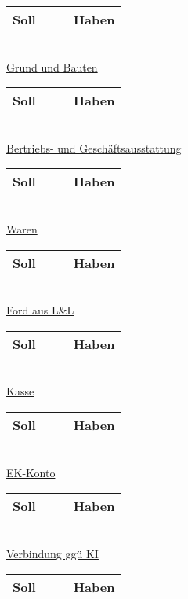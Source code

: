 \documentclass[paper=a4, fontsize=11pt]{scrartcl}
\numberwithin{equation}{section}
\numberwithin{figure}{section}
\numberwithin{table}{section}
\begin{document}
\begin{tabular}{cc|cc}
\hline
Soll & & & Haben \\
\hline
 
\end{tabular}
\\

\underline{Grund und Bauten}

\begin{tabular}{cc|cc}
\hline
Soll & & & Haben \\
\hline
\end{tabular}
\\

\underline{Bertriebs- und Geschäftsausstattung}

\begin{tabular}{cc|cc}
\hline
Soll & & & Haben \\
\hline
\end{tabular}
\\

\underline{Waren}

\begin{tabular}{cc|cc}
\hline
Soll & & & Haben \\
\hline
\end{tabular}
\\

\underline{Ford aus L&L}

\begin{tabular}{cc|cc}
\hline
Soll & & & Haben \\
\hline
\end{tabular}
\\

\underline{Kasse}

\begin{tabular}{cc|cc}
\hline
Soll & & & Haben \\
\hline
\end{tabular}
\\

\underline{EK-Konto}

\begin{tabular}{cc|cc}
\hline
Soll & & & Haben \\
\hline
\end{tabular}
\\

\underline{Verbindung ggü KI}

\begin{tabular}{cc|cc}
\hline
Soll & & & Haben \\
\hline
\end{tabular}
\\
\end{document}
